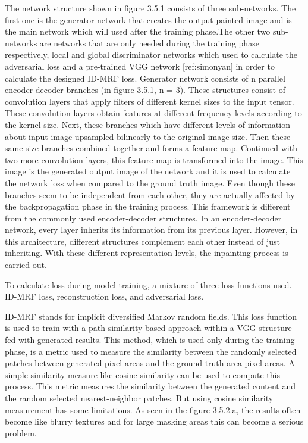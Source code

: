 The network structure shown in figure 3.5.1 consists of three sub-networks. The first one is the generator network that creates the output painted image and is the main network which will used after the training phase.The other two sub-networks are networks that are only needed during the training phase respectively, local and global discriminator networks which used to calculate the adversarial loss and a pre-trained VGG network [ref:simonyan] in order to calculate the designed ID-MRF loss. Generator network consists of n parallel encoder-decoder branches (in figure 3.5.1, n = 3). These structures consist of convolution layers that apply filters of different kernel sizes to the input tensor. These convolution layers obtain features at different frequency levels according to the kernel size. Next, these branches which have different levels of information about input image upsampled bilinearly to the original image size. Then these same size branches combined together and forms a feature map. Continued with two more convolution layers, this feature map is transformed into the image. This image is the generated output image of the network and it is used to calculate the network loss when compared to the ground truth image. Even though these branches seem to be independent from each other, they are actually affected by the backpropagation phase in the training process. This framework is different from the commonly used encoder-decoder structures. In an encoder-decoder network, every layer inherits its information from its previous layer. However, in this architecture, different structures complement each other instead of just inheriting. With these different representation levels, the inpainting process is carried out.

To calculate loss during model training, a mixture of three loss functions used. ID-MRF loss, reconstruction loss, and adversarial loss.

ID-MRF stands for implicit diversified Markov random fields. This loss function is used to train with a path similarity based approach within a VGG structure fed with generated results. This method, which is used only during the training phase, is a metric used to measure the similarity between the randomly selected patches between generated pixel areas and the ground truth area pixel areas. A simple similarity measure like cosine similarity can be used to compute this process. This metric measures the similarity between the generated content and the random selected nearest-neighbor patches. But using cosine similarity measurement has some limitations. As seen in the figure 3.5.2.a, the results often become like blurry textures and for large masking areas this can become a serious problem.

